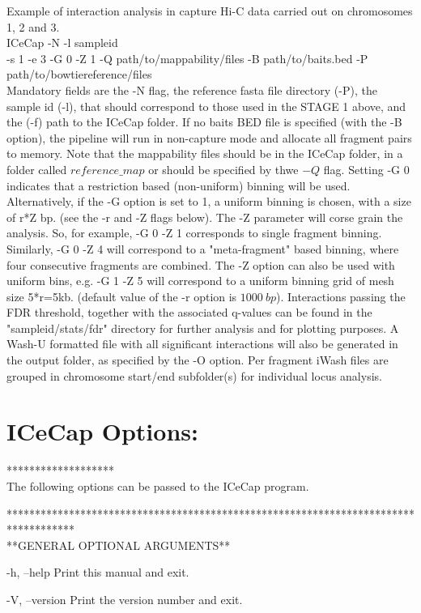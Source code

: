 \documentclass[10pt,a4paper]{article}
\begin{document}
Example of interaction analysis in capture Hi-C data carried out on chromosomes 1, 2 and 3.
\\
ICeCap -N -l sampleid \\
-s 1 -e 3 -G 0 -Z 1 -Q path/to/mappability/files -B path/to/baits.bed -P path/to/bowtiereference/files \\

Mandatory fields are the -N flag, the reference fasta file directory (-P), the sample id (-l), that should correspond to those used in the STAGE 1 above, and the (-f) path to the ICeCap folder.
If no baits BED file is specified (with the -B option), the pipeline will run in non-capture mode and allocate all fragment pairs to memory.
Note that the mappability files should be in the ICeCap folder, in a folder called $reference\_map$ or should be specified by thwe $-Q$ flag.
Setting -G 0 indicates that a restriction based (non-uniform) binning will be used.
Alternatively, if the -G option is set to 1, a uniform binning is chosen, with a size of r*Z bp. (see the -r and -Z flags below).
The -Z parameter will corse grain the analysis. So, for example, -G 0 -Z 1 corresponds to single fragment binning.
Similarly, -G 0 -Z 4 will correspond to a "meta-fragment" based binning, where four consecutive fragments are combined.
The -Z option can also be used with uniform bins, e.g. -G 1 -Z 5 will correspond to a uniform binning grid of mesh size 5*r=5kb. (default value 
of the -r option is $1000~bp$).
Interactions passing the FDR threshold, together with the associated q-values can be found in the "sampleid/stats/fdr" directory for further analysis and for plotting purposes. A Wash-U formatted file with all significant interactions will also be generated in the output folder, as specified by the -O option. Per fragment iWash files are grouped in chromosome start/end subfolder(s) for individual locus analysis.

\section{ICeCap Options:}
*******************\\
The following options can be passed to the ICeCap program.

************************************************************************************\\
**GENERAL OPTIONAL ARGUMENTS**

        -h, --help    Print this manual and exit.

        -V, --version   Print the version number and exit.
\end{document}
